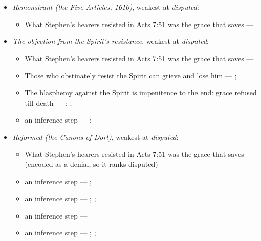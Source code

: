 \documentclass[11pt]{article}
\begin{document}
\begin{itemize}
\begin{itemize}
\end{itemize}
\item \emph{Remonstrant (the Five Articles, 1610)}, weakest at \emph{disputed}:
\begin{itemize}
\item What Stephen’s hearers resisted in Acts 7:51 was the grace that saves --- \cite[Five Arminian Articles (1610), art. 4]{schaff-creeds-christendom-3-1977}
\end{itemize}
\item \emph{The objection from the Spirit’s resistance}, weakest at \emph{disputed}:
\begin{itemize}
\item What Stephen’s hearers resisted in Acts 7:51 was the grace that saves --- \cite[Five Arminian Articles (1610), art. 4]{schaff-creeds-christendom-3-1977}
\item Those who obstinately resist the Spirit can grieve and lose him --- \cite[Solid Declaration II.83]{concordia-triglotta-1921}; \cite[Solid Declaration XI.42]{concordia-triglotta-1921}
\item The blasphemy against the Spirit is impenitence to the end: grace refused till death --- \cite[325]{npnf1-06-1888}; \cite[II-II q.14 a.1]{aquinas-summa-1920}; \cite[74]{calvin-harmony-evangelists-2-1845}
\item an inference step --- \cite[325]{npnf1-06-1888}; \cite[On Rebuke and Grace, ch. 43]{npnf1-05-1887}
\end{itemize}
\item \emph{Reformed (the Canons of Dort)}, weakest at \emph{disputed}:
\begin{itemize}
\item What Stephen’s hearers resisted in Acts 7:51 was the grace that saves (encoded as a denial, so it ranks disputed) --- \cite[Canons of Dort, III/IV, art. 9]{schaff-creeds-christendom-3-1977}
\item an inference step --- \cite[ad loc. Eph 2:8]{robertson-word-pictures-4-1931}; \cite[228--229]{calvin-galatians-ephesians-1854}
\item an inference step --- \cite[600]{arminius-works-1-1825}; \cite[681]{arminius-works-1-1825}; \cite[Five Arminian Articles (1610), art. 4]{schaff-creeds-christendom-3-1977}
\item an inference step --- \cite[527--565]{arminius-works-3-1853}
\item an inference step --- \cite[Solid Declaration II.89]{concordia-triglotta-1921}; \cite[Solid Declaration II.60]{concordia-triglotta-1921}; \cite[Solid Declaration XI.41]{concordia-triglotta-1921}

\end{itemize}
\end{itemize}
\end{document}
